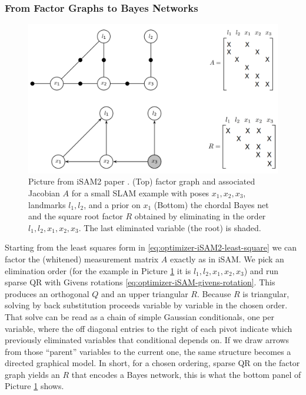 \subsubsection{From Factor Graphs to Bayes Networks}
\begin{figure}[H]
    \centering
    \includegraphics[width=0.98\linewidth]{Pictures/Optimizers/iSAM2/Factor_graph_to_Bayes_network.png}
    \caption{Picture from \gls{iSAM}2 paper \cite{iSAM2_paper}. (Top) factor graph and associated Jacobian $A$ for a small \gls{SLAM} example with poses $x_1,x_2,x_3$, landmarks $l_1,l_2$, and a prior on $x_1$ (Bottom) the chordal Bayes net and the square root factor $R$ obtained by eliminating in the order $l_1,l_2,x_1,x_2,x_3$. The last eliminated variable (the root) is shaded. \cite{iSAM2_paper}}
    \label{fig:optimizer-iSAM2-factor-graph-to-bayes-netwrok}
\end{figure}
\noindent
Starting from the least squares form in \eqref{eq:optimizer-iSAM2-least-square} we can factor the (whitened) measurement matrix $A$ exactly as in \gls{iSAM}. We pick an elimination order (for the example in Picture \ref{fig:optimizer-iSAM2-factor-graph-to-bayes-netwrok} it is $l_1,l_2,x_1,x_2,x_3$) and run sparse QR with Givens rotations \eqref{eq:optimizer-iSAM-givens-rotation}. This produces an orthogonal $Q$ and an upper triangular $R$. Because $R$ is triangular, solving by back substitution proceeds variable by variable in the chosen order. That solve can be read as a chain of simple Gaussian conditionals, one per variable, where the off diagonal entries to the right of each pivot indicate which previously eliminated variables that conditional depends on. If we draw arrows from those ``parent'' variables to the current one, the same structure becomes a directed graphical model. In short, for a chosen ordering, sparse QR on the factor graph yields an $R$ that encodes a Bayes network, this is what the bottom panel of Picture \ref{fig:optimizer-iSAM2-factor-graph-to-bayes-netwrok} shows.
